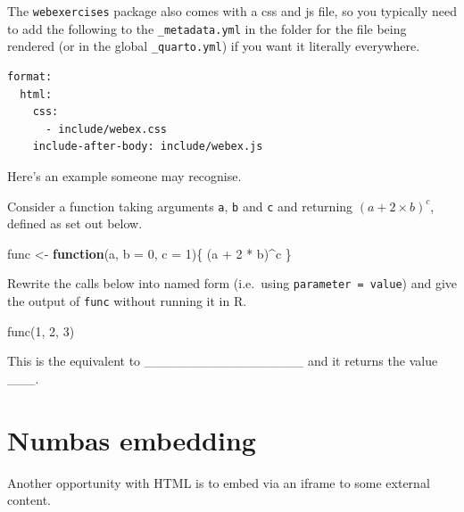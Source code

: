 \documentclass[
  a4paper,
  DIV=11,
  numbers=noendperiod,
  oneside]{scrreport}
\newenvironment{Shaded}{\begin{snugshade}}{\end{snugshade}}
\newcommand{\AttributeTok}[1]{\textcolor[rgb]{0.40,0.45,0.13}{#1}}
\newcommand{\ControlFlowTok}[1]{\textcolor[rgb]{0.00,0.23,0.31}{\textbf{#1}}}
\newcommand{\DecValTok}[1]{\textcolor[rgb]{0.68,0.00,0.00}{#1}}
\newcommand{\FunctionTok}[1]{\textcolor[rgb]{0.28,0.35,0.67}{#1}}
\newcommand{\NormalTok}[1]{\textcolor[rgb]{0.00,0.23,0.31}{#1}}
\newcommand{\OtherTok}[1]{\textcolor[rgb]{0.00,0.23,0.31}{#1}}
\newcommand{\SpecialCharTok}[1]{\textcolor[rgb]{0.37,0.37,0.37}{#1}}
\newenvironment{fbxSimple}[3]{\begin{tcolorbox}[enhanced, breakable,%
attach boxed title to top*={xshift=1.4pt},
boxed title style={boxrule=0.0mm, fuzzy shadow={1pt}{-1pt}{0mm}{0.1mm}{gray}, arc=.3em, rounded corners=east, sharp corners=west}, colframe=#1-color2, colbacktitle=#1-color1, colback = white, coltitle=black,  titlerule=0mm, toprule=0pt, bottomrule=.7pt, leftrule=.3em, rightrule=.7pt, outer arc=.3em,  	left=.5em, right=.5em, bottomtitle=1mm, toptitle=1mm,title=\textbf{#2}\hspace{0.5em}{#3}]}
{\end{tcolorbox}}
\begin{document}
The \texttt{webexercises} package also comes with a css and js file, so
you typically need to add the following to the \texttt{\_metadata.yml}
in the folder for the file being rendered (or in the global
\texttt{\_quarto.yml}) if you want it literally everywhere.

\begin{verbatim}
format:
  html:
    css:
      - include/webex.css
    include-after-body: include/webex.js
\end{verbatim}

Here's an example someone may recognise.

\label{Example-1}
\begin{fbxSimple}{Example}{Example 1}{}
\label{Example-1}
Consider a function taking arguments \texttt{a}, \texttt{b} and
\texttt{c} and returning \((a+2\times b)^c\), defined as set out below.

\begin{Shaded}
\begin{Highlighting}[]
\NormalTok{func }\OtherTok{\textless{}{-}}  \ControlFlowTok{function}\NormalTok{(a, }\AttributeTok{b =} \DecValTok{0}\NormalTok{, }\AttributeTok{c =} \DecValTok{1}\NormalTok{)\{}
\NormalTok{    (a }\SpecialCharTok{+} \DecValTok{2} \SpecialCharTok{*}\NormalTok{ b)}\SpecialCharTok{\^{}}\NormalTok{c}
\NormalTok{\}}
\end{Highlighting}
\end{Shaded}

Rewrite the calls below into named form (i.e.~using
\texttt{parameter\ =\ value}) and give the output of \texttt{func}
without running it in R.

\begin{Shaded}
\begin{Highlighting}[]
\FunctionTok{func}\NormalTok{(}\DecValTok{1}\NormalTok{, }\DecValTok{2}\NormalTok{, }\DecValTok{3}\NormalTok{)}
\end{Highlighting}
\end{Shaded}

This is the equivalent to \_\_\_\_\_\_\_\_\_\_\_\_\_\_\_\_\_ and it
returns the value \_\_\_.

\end{fbxSimple}

\section{Numbas embedding}\label{numbas-embedding}

Another opportunity with HTML is to embed via an iframe to some external
content.
\end{document}

